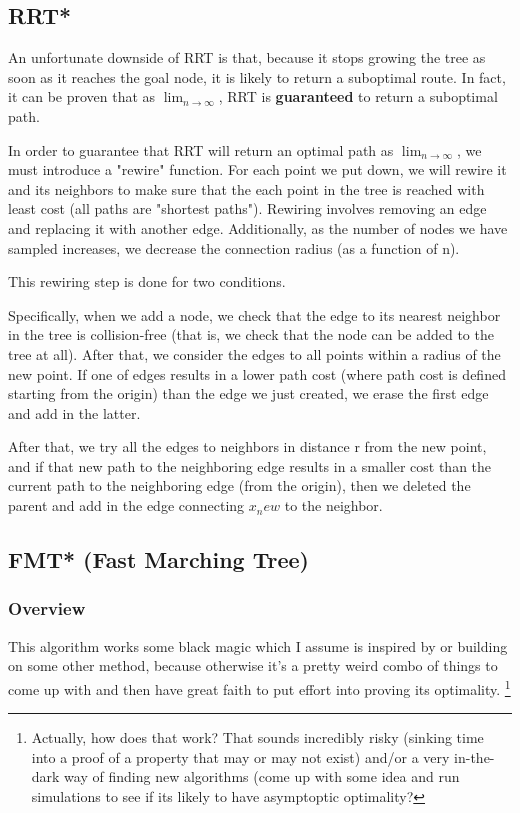 \documentclass[a4paper]{article}
\begin{document}
\subsection{RRT*}

An unfortunate downside of RRT is that, because it stops growing the tree as
soon as it reaches the goal node, it is likely to return a suboptimal route. In
fact, it can be proven that as $\lim_{n\to \infty}$, RRT is \textbf{guaranteed} to return a suboptimal path. 

In order to guarantee that RRT will return an optimal path as $\lim_{n\to
\infty}$, we must introduce a "rewire" function. For each point we put down, we
will rewire it and its neighbors to make sure that the each point in the tree is
reached with least cost (all paths are "shortest paths"). Rewiring involves
removing an edge and replacing it with another edge. Additionally, as the number
of nodes we have sampled increases, we decrease the connection radius (as a
function of n).

This rewiring step is done for two conditions.

Specifically, when we add a node, we check that the edge to its nearest neighbor
in the tree is collision-free (that is, we check that the node can be added to
the tree at all). After that, we consider the edges to all points within a
radius of the new point. If one of edges results in a lower path cost (where
path cost is defined starting from the origin) than the edge we just created, we
erase the first edge and add in the latter. 

After that, we try all the edges to neighbors in distance r from the new point,
and if that new path to the neighboring edge results in a smaller cost than the
current path to the neighboring edge (from the origin), then we deleted the
parent and add in the edge connecting $x_new$ to the neighbor.


\subsection{FMT* (Fast Marching Tree)}

\subsubsection{Overview}
This algorithm works some black magic which I assume is inspired by or building
on some other method, because otherwise it's a pretty weird combo of things to come up with
and then have great faith to put effort into proving its optimality. \footnote{Actually,
how does that work? That sounds incredibly risky (sinking time into a proof of a
property that may or may not exist) and/or a very in-the-dark way
of finding new algorithms (come up with some idea and run simulations to see if
its likely to have asymptoptic optimality?}
\end{document}
